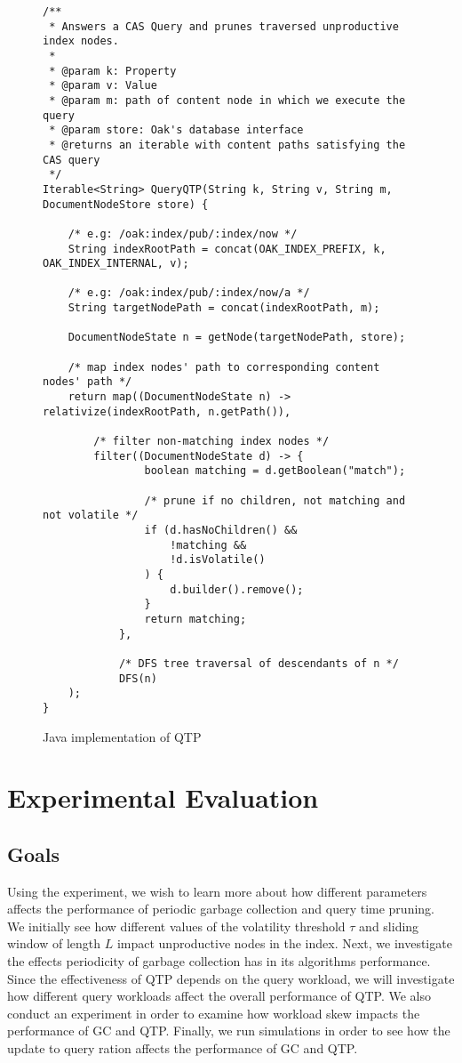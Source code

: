 \documentclass[abstracton,12pt]{scrartcl}
\theoremstyle{definition}
\begin{document}
\begin{figure}[h]
  \centering
\begin{verbatim}
/**
 * Answers a CAS Query and prunes traversed unproductive index nodes.
 *
 * @param k: Property
 * @param v: Value
 * @param m: path of content node in which we execute the query
 * @param store: Oak's database interface
 * @returns an iterable with content paths satisfying the CAS query
 */
Iterable<String> QueryQTP(String k, String v, String m, DocumentNodeStore store) {

    /* e.g: /oak:index/pub/:index/now */
    String indexRootPath = concat(OAK_INDEX_PREFIX, k, OAK_INDEX_INTERNAL, v); 

    /* e.g: /oak:index/pub/:index/now/a */
    String targetNodePath = concat(indexRootPath, m);

    DocumentNodeState n = getNode(targetNodePath, store);

    /* map index nodes' path to corresponding content nodes' path */
    return map((DocumentNodeState n) -> relativize(indexRootPath, n.getPath()),

        /* filter non-matching index nodes */
        filter((DocumentNodeState d) -> {
                boolean matching = d.getBoolean("match");

                /* prune if no children, not matching and not volatile */
                if (d.hasNoChildren() &&
                    !matching &&
                    !d.isVolatile()
                ) {
                    d.builder().remove();
                }
                return matching;
            },

            /* DFS tree traversal of descendants of n */
            DFS(n)
    );
}
\end{verbatim}
  \caption{Java implementation of QTP}
  \label{fig:java_qtp}
\end{figure}

\newpage

\section{Experimental Evaluation}
\label{sec:experimental-evaluation}

\subsection{Goals}

Using the experiment, we wish to learn more about how different parameters
affects the performance of periodic garbage collection and query time pruning.
We initially see how different values of the volatility threshold $\tau$
and sliding window of length $L$ impact unproductive nodes in the index. Next,
we investigate the effects periodicity of garbage collection has in its
algorithms performance. Since the effectiveness of QTP depends on the query
workload, we will investigate how different query workloads affect the overall
performance of QTP. We also conduct an experiment in order to examine how
workload skew impacts the performance of GC and QTP. Finally, we run simulations
in order to see how the update to query ration affects the performance of GC and QTP.
\end{document}
